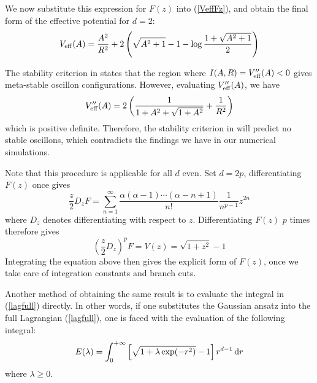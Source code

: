 \documentclass{report}
\begin{document}
We now substitute this expression for $F(z)$ into (\ref{VeffFz}), and obtain the final form of the effective potential for $d=2$:
\begin{equation}
  V_{\rm eff}(A) = \frac{A^2}{R^2} + 2 \left(\sqrt{A^2+1}-1-\log \frac{1+\sqrt{A^2+1}}{2}\right)
\end{equation}

The stability criterion in \cite{Gleiser:2008ty} states that the region where $I(A,R) = V''_{\rm eff}(A)<0$ gives meta-stable oscillon configurations. However, evaluating $V''_{\rm eff}(A)$, we have
\begin{equation}
  V''_{\rm eff}(A) = 2 \left(\frac{1}{1 + A^2 + \sqrt{1 + A^2}} + \frac{1}{R^2}\right)
\end{equation}
which is positive definite. Therefore, the stability criterion in \cite{Gleiser:2008ty} will predict no stable oscillons, which contradicts the findings we have in our numerical simulations.

Note that this procedure is applicable for all $d$ even. Set $d=2p$, differentiating $F(z)$ once gives
\begin{equation}
  \frac{z}{2}D_z F = \sum_{n=1}^\infty\frac{\alpha(\alpha-1)\cdots(\alpha-n+1)}{n!} \frac{1}{n^{p-1}} z^{2n}
\end{equation}
where $D_z$ denotes differentiating with respect to $z$. Differentiating $F(z)$ $p$ times therefore gives
\begin{equation}
  \left(\frac{z}{2}D_z\right)^p F = V(z) = \sqrt{1+z^2}-1
\end{equation}
Integrating the equation above then gives the explicit form of $F(z)$, once we take care of integration constants and branch cuts.

Another method of obtaining the same result is to evaluate the integral in (\ref{lagfull}) directly. In other words, if one substitutes the Gaussian ansatz into the full Lagrangian (\ref{lagfull}), one is faced with the evaluation of the following integral:
\begin{equation}\label{intE}
  E(\lambda) = \int^{+\infty}_0 \left[\sqrt{1+\lambda\exp(-r^2)} -1\right]r^{d-1}\,{\rm d}r
\end{equation}
where $\lambda \ge 0$.%
\end{document}
